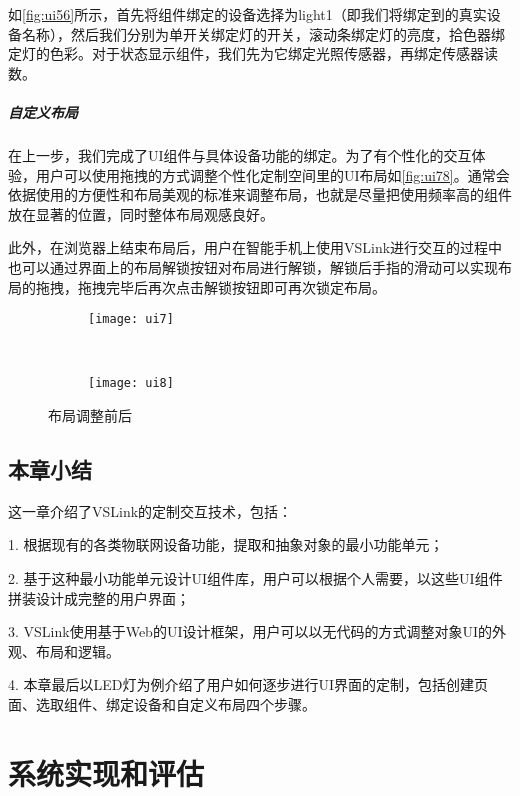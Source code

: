 如\autoref{fig:ui56}所示，首先将组件绑定的设备选择为light1（即我们将绑定到的真实设备名称），然后我们分别为单开关绑定灯的开关，滚动条绑定灯的亮度，拾色器绑定灯的色彩。对于状态显示组件，我们先为它绑定光照传感器，再绑定传感器读数。

\paragraph{自定义布局}
在上一步，我们完成了UI组件与具体设备功能的绑定。为了有个性化的交互体验，用户可以使用拖拽的方式调整个性化定制空间里的UI布局如\autoref{fig:ui78}。通常会依据使用的方便性和布局美观的标准来调整布局，也就是尽量把使用频率高的组件放在显著的位置，同时整体布局观感良好。

此外，在浏览器上结束布局后，用户在智能手机上使用VSLink进行交互的过程中也可以通过界面上的布局解锁按钮对布局进行解锁，解锁后手指的滑动可以实现布局的拖拽，拖拽完毕后再次点击解锁按钮即可再次锁定布局。

\begin{figure}[htbp]
	\centering
	\begin{subfigure}{.65\linewidth}
		\texttt{[image: ui7]}
		\caption{}
	\end{subfigure}
	\ 
	\begin{subfigure}{.65\linewidth}
		\texttt{[image: ui8]}
		\caption{}
	\end{subfigure}
	\caption{布局调整前后}\label{fig:ui78}
\end{figure}

\section{本章小结}
这一章介绍了VSLink的定制交互技术，包括：

1. 根据现有的各类物联网设备功能，提取和抽象对象的最小功能单元；

2. 基于这种最小功能单元设计UI组件库，用户可以根据个人需要，以这些UI组件拼装设计成完整的用户界面；

3. VSLink使用基于Web的UI设计框架，用户可以以无代码的方式调整对象UI的外观、布局和逻辑。

4. 本章最后以LED灯为例介绍了用户如何逐步进行UI界面的定制，包括创建页面、选取组件、绑定设备和自定义布局四个步骤。

\chapter{系统实现和评估}
\label{chap:eval}
